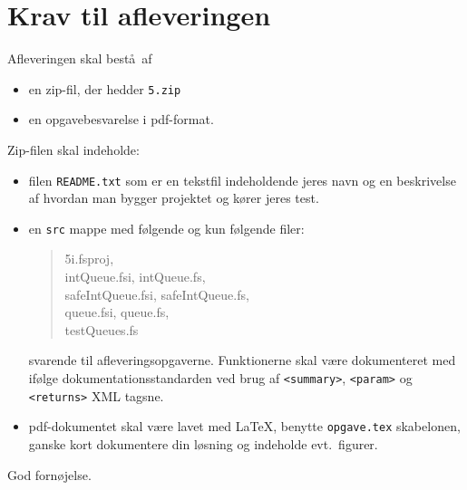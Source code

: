 \documentclass[a4paper,12pt]{article}
\newcommand{\exerciseNumber}{5}
\begin{document}
\section*{Krav til afleveringen}
Afleveringen skal best\aa\ af
\begin{itemize}
  \item en zip-fil, der hedder \texttt{\exerciseNumber\typeLetter.zip}
  \item en opgavebesvarelse i pdf-format.
\end{itemize}
Zip-filen skal indeholde:
\begin{itemize}
\item filen \texttt{README.txt} som er en tekstfil indeholdende jeres navn og en beskrivelse af hvordan man bygger projektet og kører jeres test.
\item en \texttt{src} mappe med følgende og kun
  følgende filer:
  \begin{quote}
    5i.fsproj, \\
    intQueue.fsi, intQueue.fs,\\
    safeIntQueue.fsi, safeIntQueue.fs,\\
    queue.fsi, queue.fs,\\
    testQueues.fs\\
  \end{quote}
  svarende til afleveringsopgaverne. Funktionerne skal være dokumenteret med ifølge dokumentationsstandarden ved brug af \verb|<summary>|, \verb|<param>| og \verb|<returns>| XML tagsne.
  \item pdf-dokumentet skal være lavet med \LaTeX, benytte \lstinline[language=console]{opgave.tex} skabelonen, ganske kort dokumentere din løsning og indeholde evt.\ figurer.
\end{itemize}

\flushright God fornøjelse.
\end{document}
